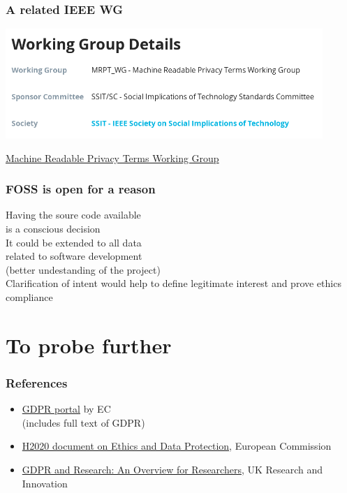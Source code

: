\documentclass[17pt,aspectratio=169,hyperref={pdfusetitle,colorlinks,allcolors=olive}]{beamer}
\begin{document}
\begin{frame}[fragile]
  \frametitle{A related IEEE WG}

  \begin{center}
    \includegraphics[width=12cm]{figs/ieee-wg}
  \end{center}

  \begin{flushright}
    \href{https://standards.ieee.org/project/7012.html}{Machine Readable Privacy Terms Working Group}
  \end{flushright}
\end{frame}

\begin{frame}[fragile]
  \frametitle{FOSS is open for a reason}

  Having the soure code available \\
  is a conscious decision\\
  \vspace{.3cm}
  It could be extended to all data \\
  related to software development \\
  (better undestanding of the project) \\
  \vspace{.3cm}
  Clarification of intent would help to define legitimate interest and prove ethics compliance
\end{frame}



\section{To probe further}


\begin{frame}[fragile]
  \frametitle{References}

  \begin{itemize}
  \item \href{https://gdpr.eu/}{GDPR portal} by EC \\
    (includes full text of GDPR)
  \item \href{https://ec.europa.eu/research/participants/data/ref/h2020/grants_manual/hi/ethics/h2020_hi_ethics-data-protection_en.pdf}{H2020 document on Ethics and Data Protection}, European Commission
  \item \href{https://www.ukri.org/files/about/policy/ukri-gdpr-faqs-pdf}{GDPR and Research: An Overview for Researchers}, UK Research and Innovation
  \end{itemize}
  
\end{frame}
\end{document}
